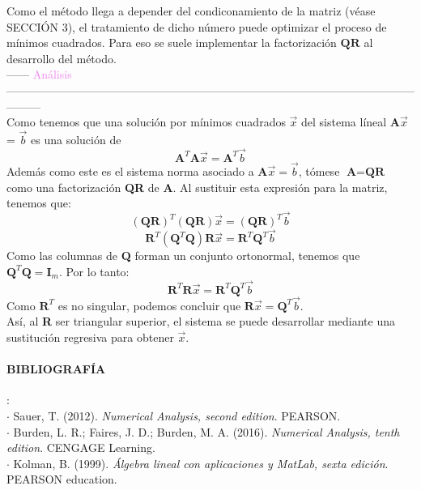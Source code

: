 \documentclass[11pt]{article}
\theoremstyle{definition}
\begin{document}
\begin{enumerate}[(i)]
Como el m\'etodo llega a depender del condiconamiento de la matriz (v\'ease SECCI\'ON 3), el tratamiento de dicho n\'umero puede optimizar el proceso de m\'inimos cuadrados. Para eso se suele implementar la factorizaci\'on $\textbf{QR}$ al desarrollo del m\'etodo.\\
\vspace{2mm} %
------ \textcolor{violet}{An\'alisis} ---------------------------------------------------------------------------------------------------------------------\\
\vspace{2mm} %
Como tenemos que una soluci\'on por m\'inimos cuadrados $\vec{x}$ del sistema l\'ineal $\textbf{A}\vec{x}$ = $\vec{b}$ es una soluci\'on de
\begin{equation*}
    \textbf{A}^{T}\textbf{A}\vec{x} = \textbf{A}^{T}\vec{b}
\end{equation*}
Adem\'as como este es el sistema norma asociado a $\textbf{A}\vec{x} = \vec{b}$, t\'omese $\textbf{A} = \textbf{QR}$ como una factorizaci\'on \textbf{QR} de \textbf{A}. Al sustituir esta expresi\'on para la matriz, tenemos que:
\begin{equation*}
    (\textbf{QR})^{T}(\textbf{QR})\vec{x} = (\textbf{QR})^{T}\vec{b}
\end{equation*}
\begin{equation*}
    \textbf{R}^{T}(\textbf{Q}^{T}\textbf{Q})\textbf{R}\vec{x} = \textbf{R}^{T}\textbf{Q}^{T}\vec{b}
\end{equation*}
Como las columnas de \textbf{Q} forman un conjunto ortonormal, tenemos que $\textbf{Q}^{T}\textbf{Q} = \textbf{I}_{m}$. Por lo tanto:
\begin{equation*}
    \textbf{R}^{T}\textbf{R}\vec{x} = \textbf{R}^{T}\textbf{Q}^{T}\vec{b}
\end{equation*}
Como $\textbf{R}^{T}$ es no singular, podemos concluir que $\textbf{R}\vec{x} = \textbf{Q}^{T}\vec{b}$.\\
As\'i, al \textbf{R} ser triangular superior, el sistema se puede desarrollar mediante una sustituci\'on regresiva para obtener $\vec{x}$.

%
\end{enumerate}
%
%

\paragraph{\textbf{BIBLIOGRAF\'IA}}:\\
$\cdot$ Sauer, T. (2012). \textit{Numerical Analysis, second edition}. PEARSON.\\
$\cdot$ Burden, L. R.; Faires, J. D.; Burden, M. A. (2016). \textit{Numerical Analysis, tenth edition}. CENGAGE Learning.\\
$\cdot$ Kolman, B. (1999). \textit{\'Algebra lineal con aplicaciones y MatLab, sexta edici\'on}. PEARSON education.



%
%
%
\end{document}
